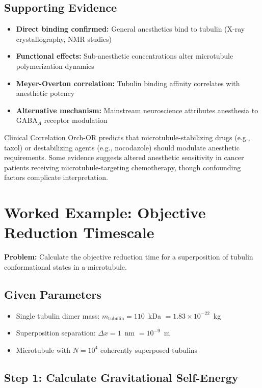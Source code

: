 \subsection{Supporting Evidence}

\begin{itemize}
\item \textbf{Direct binding confirmed:} General anesthetics bind to tubulin (X-ray crystallography, NMR studies)
\item \textbf{Functional effects:} Sub-anesthetic concentrations alter microtubule polymerization dynamics
\item \textbf{Meyer-Overton correlation:} Tubulin binding affinity correlates with anesthetic potency
\item \textbf{Alternative mechanism:} Mainstream neuroscience attributes anesthesia to GABA$_A$ receptor modulation
\end{itemize}

\begin{calloutbox}{Clinical Correlation}
Orch-OR predicts that microtubule-stabilizing drugs (e.g., taxol) or destabilizing agents (e.g., nocodazole) should modulate anesthetic requirements. Some evidence suggests altered anesthetic sensitivity in cancer patients receiving microtubule-targeting chemotherapy, though confounding factors complicate interpretation.
\end{calloutbox}

\section{Worked Example: Objective Reduction Timescale}

\textbf{Problem:} Calculate the objective reduction time for a superposition of tubulin conformational states in a microtubule.

\subsection*{Given Parameters}
\begin{itemize}
\item Single tubulin dimer mass: $m_{\text{tubulin}} = 110$~kDa $= 1.83 \times 10^{-22}$~kg
\item Superposition separation: $\Delta x = 1$~nm $= 10^{-9}$~m
\item Microtubule with $N = 10^4$ coherently superposed tubulins
\end{itemize}

\subsection*{Step 1: Calculate Gravitational Self-Energy}

